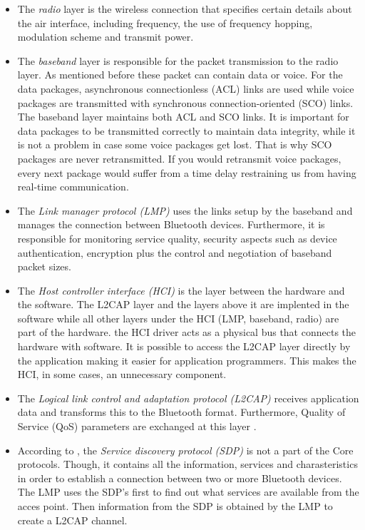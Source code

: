 \documentclass[a4paper, 11pt]{report}
\begin{document}
		\begin{itemize}
			\item The \textit{radio} layer is the wireless connection that specifies certain details about the air interface, including frequency, the use of frequency hopping, modulation scheme and transmit power. 
			\item The \textit{baseband} layer is responsible for the packet transmission to the radio layer. As mentioned before these packet can contain data or voice. For the data packages, asynchronous connectionless (ACL) links are used while voice packages are transmitted with synchronous connection-oriented (SCO) links. The baseband layer maintains both ACL and SCO links. It is important for data packages to be transmitted correctly to maintain data integrity, while it is not a problem in case some voice packages get lost. That is why SCO packages are never retransmitted. If you would retransmit voice packages, every next package would suffer from a time delay restraining us from having real-time communication.
			\item The \textit{Link manager protocol (LMP)} uses the links setup by the baseband and manages the connection between Bluetooth devices. Furthermore, it is responsible for monitoring service quality, security aspects such as device authentication, encryption plus the control and negotiation of baseband packet sizes.
			\item The \textit{Host controller interface (HCI)} is the layer between the hardware and the software. The L2CAP layer and the layers above it are implented in the software while all other layers under the HCI (LMP, baseband, radio) are part of the hardware. the HCI driver acts as a physical bus that connects the hardware with software. It is possible to access the L2CAP layer directly by the application making it easier for application programmers. This makes the HCI, in some cases, an unnecessary component.
			\item The \textit{Logical link control and adaptation protocol (L2CAP)} receives application data and transforms this to the Bluetooth format. Furthermore, Quality of Service (QoS) parameters are exchanged at this layer \cite{bluetoothStack}.
			\item According to \cite{bluetoothStack}, the \textit{Service discovery protocol (SDP)} is not a part of the Core protocols. Though, it contains all the information, services and charasteristics  in order to establish a connection between two or more Bluetooth devices. The LMP uses the SDP's first to find out what services are available from the acces point. Then information from the SDP is obtained by the LMP to create a L2CAP channel.
		\end{itemize}
		
\end{document}
